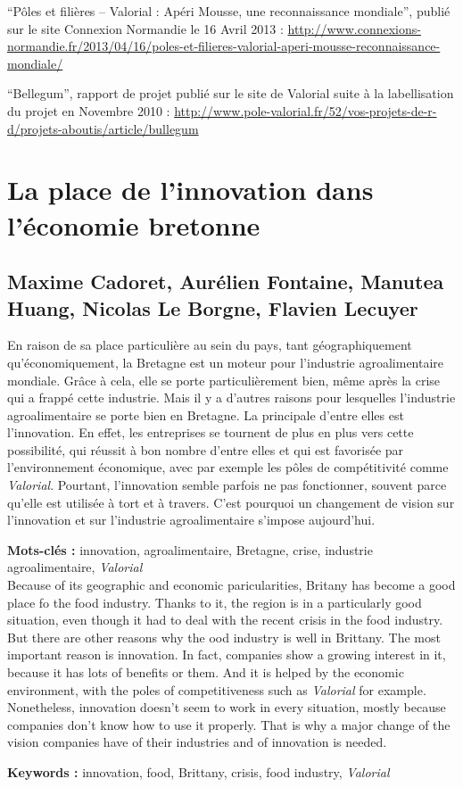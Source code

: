 \documentclass[a4paper,12pt]{report}
\begin{document}
“Pôles et filières – Valorial : Apéri Mousse, une reconnaissance mondiale”, publié sur le site Connexion Normandie le 16 Avril 2013 : \url{http://www.connexions-normandie.fr/2013/04/16/poles-et-filieres-valorial-aperi-mousse-reconnaissance-mondiale/}

“Bellegum”, rapport de projet publié sur le site de Valorial suite à la labellisation du projet en Novembre 2010 : \url{http://www.pole-valorial.fr/52/vos-projets-de-r-d/projets-aboutis/article/bullegum}

{}

\cleardoublepage

\begin{minipage}{\textwidth}	%
	\chapter*{La place de l'innovation dans l'économie bretonne}
	
	\section*{Maxime Cadoret, Aurélien Fontaine, Manutea Huang, Nicolas Le Borgne, Flavien Lecuyer}

	En raison de sa place particulière au sein du pays, tant géographiquement qu'économiquement, la Bretagne est un moteur pour l'industrie agroalimentaire mondiale. Grâce à cela, elle se porte particulièrement bien, même après la crise qui a frappé cette industrie. Mais il y a d'autres raisons pour lesquelles l'industrie agroalimentaire se porte bien en Bretagne. La principale d'entre elles est l'innovation. En effet, les entreprises se tournent de plus en plus vers cette possibilité, qui réussit à bon nombre d'entre elles et qui est favorisée par l'environnement économique, avec par exemple les pôles de compétitivité comme \textit{Valorial}. Pourtant, l'innovation semble parfois ne pas fonctionner, souvent parce qu'elle est utilisée à tort et à travers. C'est pourquoi un changement de vision sur l'innovation et sur l'industrie agroalimentaire s'impose aujourd'hui.
	
	\textbf{Mots-clés : }innovation, agroalimentaire, Bretagne, crise, industrie agroalimentaire, \textit{Valorial}\\

	Because of its geographic and economic paricularities, Britany has become a good place fo the food industry. Thanks to it, the region is in a particularly good situation, even though it had to deal with the recent crisis in the food industry. But there are other reasons why the ood industry is well in Brittany. The most important reason is innovation. In fact, companies show a growing interest in it, because it has lots of benefits or them. And it is helped by the economic environment, with the poles of competitiveness such as \textit{Valorial} for example. Nonetheless, innovation doesn't seem to work in every situation, mostly because companies don't know how to use it properly. That is why a major change of the vision companies have of their industries and of innovation is needed.

	\textbf{Keywords : }innovation, food, Brittany, crisis, food industry, \textit{Valorial}
\end{minipage}
\end{document}
